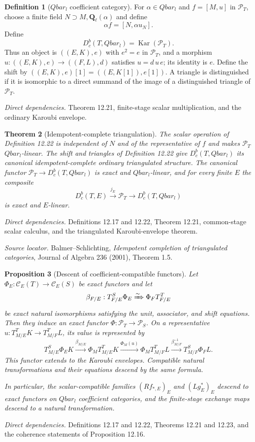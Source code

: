 \documentclass[10pt]{article}
\newtheorem{theorem}{Theorem}[section]
\newtheorem{proposition}[theorem]{Proposition}
\theoremstyle{definition}
\newtheorem{definition}[theorem]{Definition}
\newcommand{\Ql}{\mathbf Q_\ell}
\newcommand{\Qlb}{\overline{\mathbf Q}_\ell}
\newcommand{\Dbc}{D^b_c}
\newcommand{\deps}[1]{\par\smallskip\textit{Direct dependencies.} #1\par}
\newcommand{\sources}[1]{\par\textit{Source locator.} #1\par}
\def\Qlb{Qbar_l}%
\begin{document}
\begin{definition}[$\Qlb$ coefficient category]
For $\alpha\in\Qlb$ and $f=[M,u]$ in $\mathcal P_T$, choose a finite field
$N\supset M,\Ql(\alpha)$ and define
\[
 \alpha f=[N,\alpha u_N].
\]
Define
\[
 \Dbc(T,\Qlb)=\operatorname{Kar}(\mathcal P_T).
\]
Thus an object is $((E,K),e)$ with $e^2=e$ in $\mathcal P_T$, and a
morphism $u:((E,K),e)\to((F,L),d)$ satisfies $u=d\,u\,e$; its identity is
$e$.  Define the shift by $((E,K),e)[1]=((E,K[1]),e[1])$.  A triangle is
distinguished if it is isomorphic to a direct summand of the image of a
distinguished triangle of $\mathcal P_T$.
\end{definition}
\deps{Theorem 12.21, finite-stage scalar multiplication, and the ordinary
Karoubi envelope.}

\begin{theorem}[Idempotent-complete triangulation]
The scalar operation of Definition 12.22 is independent of $N$ and of the
representative of $f$ and makes $\mathcal P_T$ $\Qlb$-linear.  The shift
and triangles of Definition 12.22 give $\Dbc(T,\Qlb)$ its canonical
idempotent-complete ordinary triangulated structure.  The canonical
functor $\mathcal P_T\to\Dbc(T,\Qlb)$ is exact and $\Qlb$-linear, and for
every finite $E$ the composite
\[
 \Dbc(T,E)\xrightarrow{j_E}\mathcal P_T
 \longrightarrow\Dbc(T,\Qlb)
\]
is exact and $E$-linear.
\end{theorem}
\deps{Definitions 12.17 and 12.22, Theorem 12.21, common-stage scalar
calculus, and the triangulated Karoubi-envelope theorem.}
\sources{Balmer--Schlichting, \emph{Idempotent completion of triangulated
categories}, Journal of Algebra 236 (2001), Theorem 1.5.}

\begin{proposition}[Descent of coefficient-compatible functors]
Let $\Phi_E:\mathcal C_E(T)\to\mathcal C_E(S)$ be exact functors and let
\[
 \beta_{F/E}:T^S_{F/E}\Phi_E
 \xRightarrow{\sim}\Phi_FT^T_{F/E}
\]
be exact natural isomorphisms satisfying the unit, associator, and shift
equations.  Then they induce an exact functor
$\Phi:\mathcal P_T\to\mathcal P_S$.  On a representative
$u:T^T_{M/E}K\to T^T_{M/F}L$, its value is represented by
\[
 T^S_{M/E}\Phi_EK\xrightarrow{\beta_{M/E}}
 \Phi_MT^T_{M/E}K\xrightarrow{\Phi_M(u)}
 \Phi_MT^T_{M/F}L\xrightarrow{\beta_{M/F}^{-1}}
 T^S_{M/F}\Phi_FL.
\]
This functor extends to the Karoubi envelopes.  Compatible natural
transformations and their equations descend by the same formula.

In particular, the scalar-compatible families $(Rf_{*,E})_E$ and
$(Lg_E^*)_E$ descend to exact functors on $\Qlb$ coefficient categories,
and the finite-stage exchange maps descend to a natural transformation.
\end{proposition}
\deps{Definitions 12.17 and 12.22, Theorems 12.21 and 12.23, and the
coherence statements of Proposition 12.16.}
\end{document}
